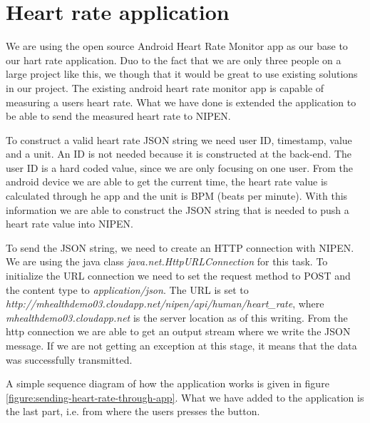 \section{Heart rate application}

We are using the open source Android Heart Rate Monitor \cite{AndroidHeartRateMonitor} app as our base to our hart rate application.
Duo to the fact that we are only three people on a large project like this, we though that it would be great to use existing solutions in our project.
The existing android heart rate monitor app is capable of measuring a users heart rate.
What we have done is extended the application to be able to send the measured heart rate to NIPEN.

To construct a valid heart rate JSON string we need user ID, timestamp, value and a unit. 
An ID is not needed because it is constructed at the back-end.
The user ID is a hard coded value, since we are only focusing on one user.
From the android device we are able to get the current time, the heart rate value is calculated through he app and the unit is BPM (beats per minute).
With this information we are able to construct the JSON string that is needed to push a heart rate value into NIPEN.

To send the JSON string, we need to create an HTTP connection with NIPEN.
We are using the java class \textit{java.net.HttpURLConnection} for this task.
To initialize the URL connection we need to set the request method to POST and the content type to \textit{application/json}.
The URL is set to \textit{http://mhealthdemo03.cloudapp.net/nipen/api/human/heart\_rate}, where \textit{mhealthdemo03.cloudapp.net} is the server location as of this writing.
From the http connection we are able to get an output stream where we write the JSON message.
If we are not getting an exception at this stage, it means that the data was successfully transmitted.

A simple sequence diagram of how the application works is given in figure \ref{figure:sending-heart-rate-through-app}.
What we have added to the application is the last part, i.e. from where the users presses the button.

